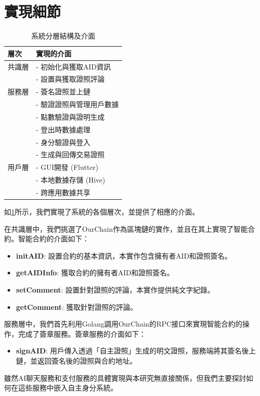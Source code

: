 \section{實現細節}
\begin{table}[htbp]
  \centering
  \caption{系統分層結構及介面}
  \label{tab:system-interfaces}
  \begin{tabularx}{\textwidth}{|l|X|}
    \hline
    \textbf{層次} & \textbf{實現的介面}    \\
    \hline
    共識層         & - 初始化與獲取AID資訊     \\
                & - 設置與獲取證照評論       \\
    \hline
    服務層         & - 簽名證照並上鏈         \\
                & - 驗證證照與管理用戶數據     \\
                & - 點數驗證與證明生成       \\
                & - 登出時數據處理         \\
                & - 身分驗證與登入         \\
                & - 生成與回傳交易證照       \\
    \hline
    用戶層         & - GUI開發 (Flutter) \\
                & - 本地數據存儲 (Hive)   \\
                & - 跨應用數據共享         \\
    \hline
  \end{tabularx}
\end{table}
如\ref{tab:system-interfaces}所示，我們實現了系統的各個層次，並提供了相應的介面。

在共識層中，我們挑選了OurChain\cite{ourlab408_ourchain}作為區塊鏈的實作，並且在其上實現了智能合約。智能合約的介面如下：
\begin{itemize}
  \item \textbf{initAID}: 設置合約的基本資訊，本實作包含擁有者AID和證照簽名。
  \item \textbf{getAIDInfo}: 獲取合約的擁有者AID和證照簽名。
  \item \textbf{setComment}: 設置針對證照的評論，本實作提供純文字紀錄。
  \item \textbf{getComment}: 獲取針對證照的評論。
\end{itemize}
服務層中，我們首先利用Golang調用OurChain的RPC接口來實現智能合約的操作，完成了簽章服務。簽章服務的介面如下：
\begin{itemize}
  \item \textbf{signAID}: 用戶傳入透過「自主證照」生成的明文證照，服務端將其簽名後上鏈，並返回簽名後的證照與合約地址。
\end{itemize}
雖然AI聊天服務和支付服務的具體實現與本研究無直接關係，但我們主要探討如何在這些服務中嵌入自主身分系統。

